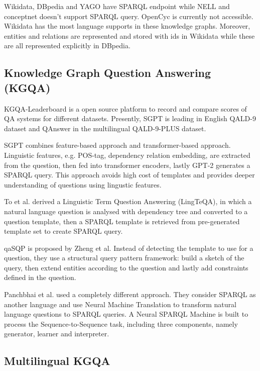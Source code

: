 Wikidata, DBpedia and YAGO have SPARQL endpoint while NELL and conceptnet doesn't support SPARQL query. 
OpenCyc is currently not accessible. Wikidata has the most language supports in these knowledge graphs. 
Moreover, entities and relations are represented 
and stored with ids in Wikidata while these are all represented explicitly in DBpedia. 

\subsection*{Knowledge Graph Question Answering (KGQA)}

KGQA-Leaderboard \cite{DBLP:journals/corr/abs-2201-08174} is a open source platform to record 
and compare scores of QA systems for different datasets. 
Presently, SGPT \cite{sgpt} is leading in English QALD-9 \cite{qald9} dataset 
and QAnswer in the multilingual QALD-9-PLUS \cite{qald9plus} dataset. 

SGPT \cite{sgpt} combines feature-based approach and transformer-based approach. 
Linguistic features, e.g. POS-tag, dependency relation embedding, are extracted from the question, 
then fed into transformer encoders, lastly GPT-2 generates a SPARQL query. 
This approach avoids high cost of templates and provides deeper understanding of questions using lingustic features. 

To et al. \cite{9282949} derived a Linguistic Term Question Answering (LingTeQA), 
in which a natural language question is analysed with dependency tree and converted to a question template, 
then a SPARQL template is retrieved from pre-generated template set to create SPARQL query. 

qaSQP \cite{https://doi.org/10.48550/arxiv.1910.09760} is proposed by Zheng et al. 
Instead of detecting the template to use for a question, 
they use a structural query pattern framework: 
build a sketch of the query, then extend entities according to the question 
and lastly add constraints defined in the question. 

Panchbhai et al. \cite{panchbhai-2020} used a completely different approach. 
They consider SPARQL as another language and use Neural Machine Translation to transform natural language questions to SPARQL queries. 
A Neural SPARQL Machine is built to process the Sequence-to-Sequence task, 
including three components, namely generator, learner and interpreter. 

\subsection*{Multilingual KGQA}

